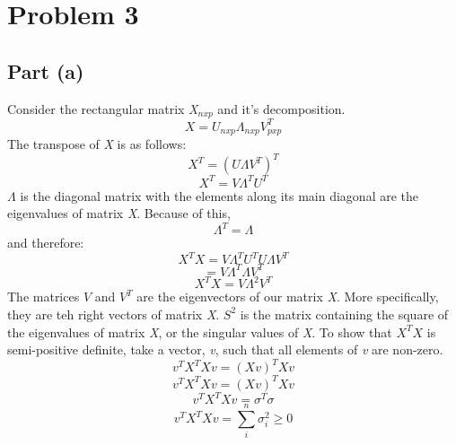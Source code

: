 \documentclass{article}\usepackage[]{graphicx}\usepackage[]{color}
\begin{document}
\section{Problem 3}
\subsection{Part (a)}
Consider the rectangular matrix \emph{X$_{nxp}$} and it's decomposition.
\[ X = U_{nxp} \Lambda_{nxp} V_{pxp}^T \]
The transpose of \emph{X} is as follows:
\[ X^T = (U \Lambda V^T)^T \]
\[ X^T = V \Lambda^T U^T \]
$\Lambda$ is the diagonal matrix with the elements along its main diagonal are the eigenvalues of matrix \emph{X}.  Because of this, $$ \Lambda^T = \Lambda $$ and therefore:
\[ X^T X = V \Lambda^T U^T U \Lambda V^T\]
\[ = V \Lambda^T \Lambda V^T\]
\[ X^T X = V \Lambda^2 V^T \]
The matrices $V$ and $V^T$ are the eigenvectors of our matrix \emph{X}.  More specifically, they are teh right vectors of matrix \emph{X}.  $S^2$ is the matrix containing the square of the eigenvalues of matrix \emph{X}, or the singular values of \emph{X}.
To show that $X^T X$ is semi-positive definite, take a vector, \emph{v}, such that all elements of \emph{v} are non-zero.
\[ v^T X^T Xv = (Xv)^T Xv \]
\[ v^T X^T Xv = (Xv)^T Xv \]
\[ v^T X^T Xv = \sigma^T \sigma \]
\[ v^T X^T Xv = \sum_i^n \sigma_i^2 \geq 0 \]
\end{document}
